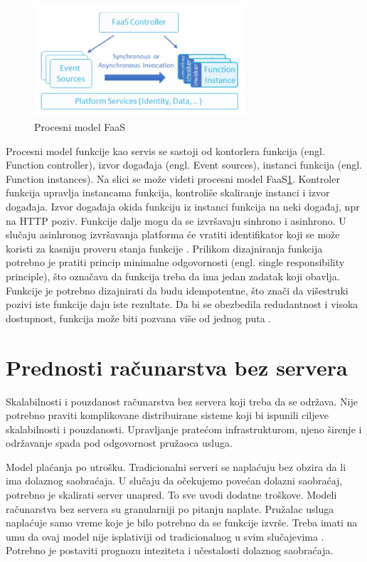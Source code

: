\documentclass[12pt,oneside]{memoir}
\begin{document}
\begin{figure}[!ht]
  \centering
  \includegraphics[width=0.7\textwidth]{Slika 7.png}
  \caption{Procesni model FaaS}
  \label{fig:faasProcesniModel}
\end{figure}


Procesni model funkcije kao servis se sastoji od kontorlera funkcija (engl. Function controller), izvor događaja (engl. Event sources), instanci funkcija (engl. Function instances). Na slici se može videti procesni model FaaS\ref{fig:faasProcesniModel}. Kontroler funkcija upravlja instancama funkcija, kontroliše skaliranje instanci i izvor događaja. Izvor događaja okida funkciju iz instanci funkcija na neki događaj, npr na HTTP poziv. Funkcije dalje mogu da se izvršavaju sinhrono i asinhrono. U slučaju asinhronog izvršavanja platforma će vratiti identifikator koji se može koristi za kasniju proveru stanja funkcije \cite{sah}. Prilikom dizajniranja funkcija potrebno je pratiti princip minimalne odgovornosti (engl. single responsibility principle), što označava da funkcija treba da ima jedan zadatak koji obavlja. Funkcije je potrebno dizajnirati da budu idempotentne, što znači da višestruki pozivi iste funkcije daju iste rezultate. Da bi se obezbedila redudantnost i visoka dostupnost, funkcija može biti pozvana više od jednog puta \cite{sah}.

\section{Prednosti računarstva bez servera}

Skalabilnosti i pouzdanost računarstva bez servera koji treba da se održava. Nije potrebno praviti komplikovane distribuirane sisteme koji bi ispunili ciljeve skalabilnosti i pouzdanosti. Upravljanje pratećom infrastrukturom, njeno širenje i održavanje spada pod odgovornost pružaoca usluga.

Model plaćanja po utrošku. Tradicionalni serveri se naplaćuju bez obzira da li ima dolaznog saobraćaja. U slučaju da očekujemo povećan dolazni saobraćaj, potrebno je skalirati server unapred. To sve uvodi dodatne troškove. Modeli računarstva bez servera su granularniji po pitanju naplate. Pružalac usluga naplaćuje samo vreme koje je bilo potrebno da se funkcije izvrše. Treba imati na umu da ovaj model nije isplativiji od tradicionalnog u svim slučajevima \cite{sa}. Potrebno je postaviti prognozu inteziteta i učestalosti dolaznog saobraćaja.
\end{document}
